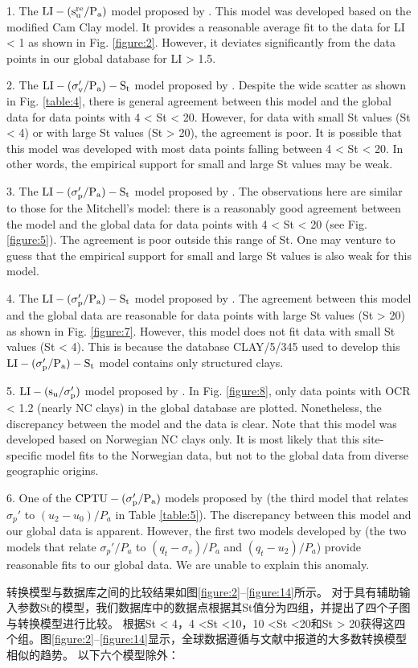 \begin{Parallel}{0.60\textwidth}{}
{        1. The $\rm{LI}-(s_u^{re}/P_a)$ model proposed by \citet{Wroth1978137}. This model was developed based on the modified Cam Clay model. It provides a reasonable average fit to the data for LI < 1 as shown in Fig. \ref{figure:2}. However, it deviates significantly from the data points in our global database for LI > 1.5.

        2. The $\rm{LI}-(\sigma_v'/P_a)-S_t$ model proposed by \citet{Mitchell1993}. Despite the wide scatter as shown in Fig. \ref{table:4}, there is general agreement between this model and the global data for data points with 4 < St < 20. However, for data with small St values (St < 4) or with large St values (St > 20), the agreement is poor. It is possible that this model was developed with most data points falling between 4 < St < 20. In other words, the empirical support for small and large St values may be weak.

        3. The $\rm{LI}-(\sigma_p'/P_a)-S_t$ model proposed by \citet{NAVFAC1982}. The observations here are similar to those for the Mitchell’s model: there is a reasonably good agreement between the model and the global data for data points with 4 < St < 20 (see Fig. \ref{figure:5}). The agreement is poor outside this range of St. One may venture to guess that the empirical support for small and large St values is also weak for this model.

        4. The $\rm{LI}-(\sigma_p'/P_a)-S_t$ model proposed by \citet{Ching2012522}. The agreement between this model and the global data are reasonable for data points with large St values (St > 20) as shown in Fig. \ref{figure:7}. However, this model does not fit data with small St values (St < 4). This is because the database CLAY/5/345 used to develop this $\rm{LI}-(\sigma_p'/P_a)-S_t$ model contains only structured clays.

        5. $\rm{LI}-(s_u/\sigma_p')$ model proposed by \citet{Bjerrum1960711}. In Fig. \ref{figure:8}, only data points with OCR < 1.2 (nearly NC clays) in the global database are plotted. Nonetheless, the discrepancy between the model and the data is clear. Note that this model was developed based on Norwegian NC clays only. It is most likely that this site-specific model fits to the Norwegian data, but not to the global data from diverse geographic origins.
        
        6. One of the $\rm{CPTU}-(\sigma_p'/P_a)$ models proposed by \citet{Chen1996488} (the third model that relates $\sigma_p'$ to $(u_2-u_0)/P_a$ in Table \ref{table:5}). The discrepancy between this model and our global data is apparent. However, the first two models developed by \citet{Chen1996488} (the two models that relate $\sigma_p'/P_a$ to $(q_t-\sigma_v)/P_a$ and $(q_t-u_2)/P_a$) provide reasonable fits to our global data. We are unable to explain this anomaly.
    }
    \ParallelRText
    {
        转换模型与数据库之间的比较结果如图\ref{figure:2}–\ref{figure:14}所示。 对于具有辅助输入参数St的模型，我们数据库中的数据点根据其St值分为四组，并提出了四个子图与转换模型进行比较。 根据St < 4，4 <St <10，10 <St <20和St > 20获得这四个组。图\ref{figure:2}–\ref{figure:14}显示，全球数据遵循与文献中报道的大多数转换模型相似的趋势。 以下六个模型除外：

}
\end{Parallel}
